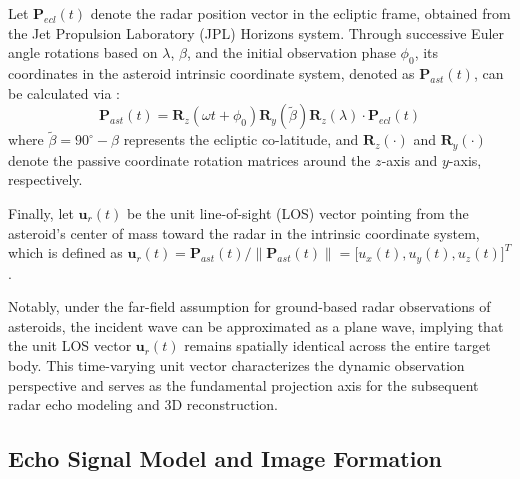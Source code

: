 \documentclass[conference]{IEEEtran}
\begin{document}
Let $\mathbf{P}_{ecl}(t)$ denote the radar position vector in the ecliptic frame, obtained from the Jet Propulsion Laboratory (JPL) Horizons system. Through successive Euler angle rotations based on $\lambda$, $\beta$, and the initial observation phase $\phi_0$, its coordinates in the asteroid intrinsic coordinate system, denoted as $\mathbf{P}_{ast}(t)$, can be calculated via \cite{Gao2026}:
\begin{equation}
	\mathbf{P}_{ast}(t) = \mathbf{R}_z(\omega t + \phi_0) \mathbf{R}_y(\widetilde{\beta}) \mathbf{R}_z(\lambda) \cdot \mathbf{P}_{ecl}(t)
\end{equation}
where $\widetilde{\beta} = 90^\circ - \beta$ represents the ecliptic co-latitude, and $\mathbf{R}_z(\cdot)$ and $\mathbf{R}_y(\cdot)$ denote the passive coordinate rotation matrices around the $z$-axis and $y$-axis, respectively.

Finally, let $\mathbf{u}_{r}(t)$ be the unit line-of-sight (LOS) vector pointing from the asteroid's center of mass toward the radar in the intrinsic coordinate system, which is defined as $\mathbf{u}_{r}(t) = \mathbf{P}_{ast}(t) / \|\mathbf{P}_{ast}(t)\|= \big[ u_x(t), u_y(t), u_z(t) \big]^T$. 

Notably, under the far-field assumption for ground-based radar observations of asteroids, the incident wave can be approximated as a plane wave, implying that the unit LOS vector $\mathbf{u}_{r}(t)$ remains spatially identical across the entire target body. This time-varying unit vector characterizes the dynamic observation perspective and serves as the fundamental projection axis for the subsequent radar echo modeling and 3D reconstruction.

\subsection{Echo Signal Model and Image Formation}\label{Echo}
\end{document}
